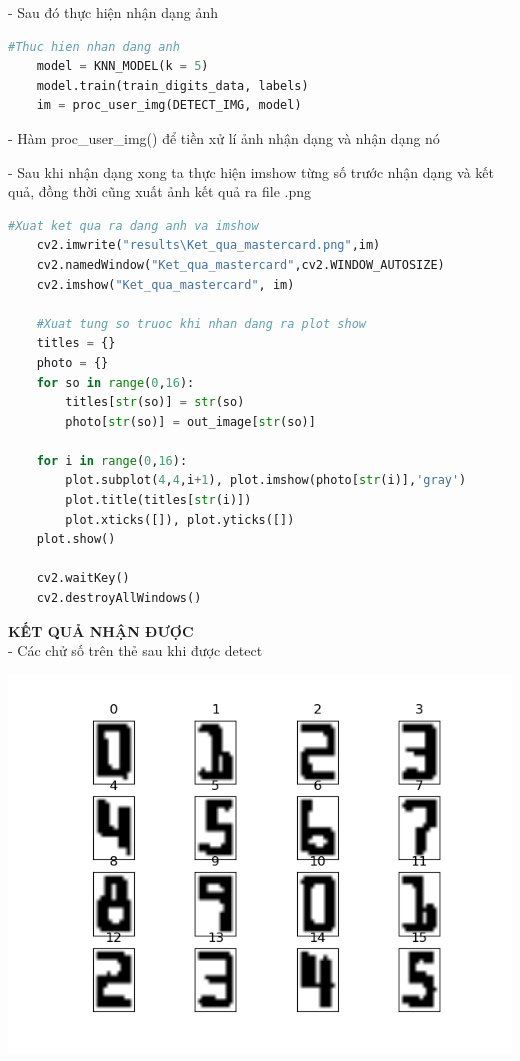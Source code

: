 - Sau đó thực hiện nhận dạng ảnh
\begin{lstlisting}[language=Python]
    #Thuc hien nhan dang anh 
    model = KNN_MODEL(k = 5)
    model.train(train_digits_data, labels)
    im = proc_user_img(DETECT_IMG, model)
\end{lstlisting}

- Hàm proc\_user\_img() để tiền xử lí ảnh nhận dạng và nhận dạng nó

- Sau khi nhận dạng xong ta thực hiện imshow từng số trước nhận dạng và kết quả, đồng thời cũng xuất ảnh kết quả ra file .png
\begin{lstlisting}[language=Python]
    #Xuat ket qua ra dang anh va imshow
    cv2.imwrite("results\Ket_qua_mastercard.png",im)
    cv2.namedWindow("Ket_qua_mastercard",cv2.WINDOW_AUTOSIZE)
    cv2.imshow("Ket_qua_mastercard", im)

    #Xuat tung so truoc khi nhan dang ra plot show
    titles = {}
    photo = {}
    for so in range(0,16):		
        titles[str(so)] = str(so)
        photo[str(so)] = out_image[str(so)]

    for i in range(0,16):
	    plot.subplot(4,4,i+1), plot.imshow(photo[str(i)],'gray')
	    plot.title(titles[str(i)])
	    plot.xticks([]), plot.yticks([])
    plot.show()
    
    cv2.waitKey() 
    cv2.destroyAllWindows()          
\end{lstlisting}

\quad \textbf{KẾT QUẢ NHẬN ĐƯỢC} \\[0.2cm]

- Các chử số trên thẻ sau khi được detect 

\includegraphics[]{images/mastercard/digits.png}

